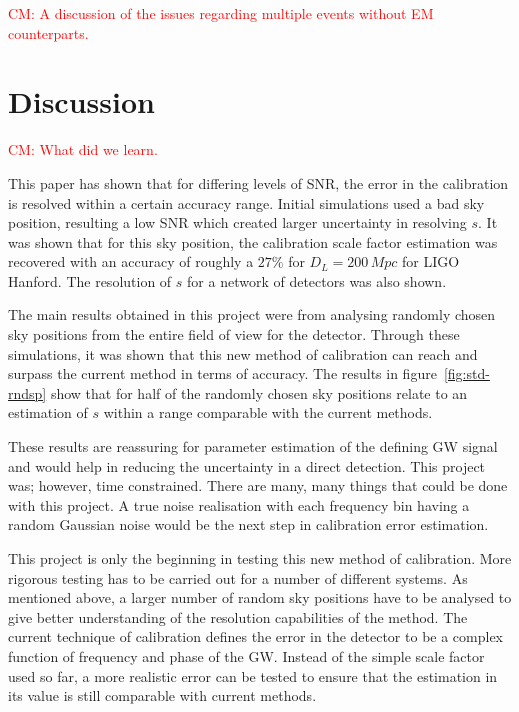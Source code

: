 \documentclass[12pt]{iopart}
\newcommand{\cm}[1]{\textcolor{red}{CM: #1}}
\begin{document}
\cm{A discussion of the issues regarding multiple events
without EM counterparts.}

\section{Discussion\label{sec:discussion}}

\cm{What did we learn.}

This paper has shown that for differing levels of SNR, the error in the
calibration is resolved within a certain accuracy range. Initial simulations
used a bad sky position, resulting a low SNR which created larger uncertainty
in resolving $s$. It was shown that for this sky position, the calibration
scale factor estimation was recovered with an accuracy of roughly a $27\%$ for
$D_{L} = 200\,Mpc$ for LIGO Hanford. The resolution of $s$ for a network of
detectors was also shown.

The main results obtained in this project were from analysing randomly chosen
sky positions from the entire field of view for the detector. Through these
simulations, it was shown that this new method of calibration can reach and
surpass the current method in terms of accuracy. The results in
figure~\ref{fig:std-rndsp} show that for half of the randomly chosen sky
positions relate to an estimation of $s$ within a range comparable with the
current methods.

These results are reassuring for parameter estimation of the defining GW signal
and would help in reducing the uncertainty in a direct detection. This project
was; however, time constrained. There are many, many things that could be done
with this project. A true noise realisation with each frequency bin having a
random Gaussian noise would be the next step in calibration error estimation.

This project is only the beginning in testing this new method of calibration.
More rigorous testing has to be carried out for a number of different systems.
As mentioned above, a larger number of random sky positions have to be analysed
to give better understanding of the resolution capabilities of the method. The
current technique of calibration defines the error in the detector to be a
complex function of frequency and phase of the GW. Instead of the simple scale
factor used so far, a more realistic error can be tested to ensure that the
estimation in its value is still comparable with current methods.
\end{document}
